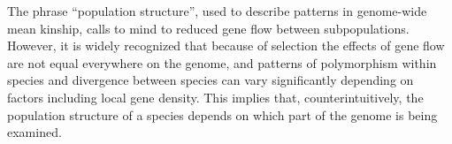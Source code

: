 \documentclass[11pt, oneside]{article}   	%
\begin{document}


The phrase ``population structure'',
used to describe patterns in genome-wide mean kinship,
calls to mind to reduced gene flow between subpopulations. %
However, it is widely recognized that because of selection the effects of gene flow are not equal everywhere on the genome,
and patterns of polymorphism within species and divergence between species can vary significantly depending on factors including local gene density.
This implies that, counterintuitively, 
the population structure of a species depends on which part of the genome is being examined.

\end{document}
